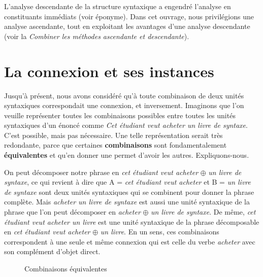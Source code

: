 L’analyse descendante de la structure syntaxique a engendré l’analyse en constituants immédiats (voir  éponyme). Dans cet ouvrage, nous privilégions une analyse ascendante, tout en exploitant les avantages d’une analyse descendante (voir la  \textit{Combiner les méthodes ascendante et descendante}).

\section{La connexion et ses instances}\label{sec:3.2.14}

Jusqu’à présent, nous avons considéré qu’à toute combinaison de deux unités syntaxiques correspondait une connexion, et inversement. Imaginons que l’on veuille représenter toutes les combinaisons possibles entre toutes les unités syntaxiques d’un énoncé comme \textit{Cet étudiant veut acheter un livre de syntaxe}. C’est possible, mais pas nécessaire. Une telle représentation serait très redondante, parce que certaines \textbf{combinaisons} sont fondamentalement \textbf{équivalentes} et qu’en donner une permet d’avoir les autres. Expliquons-nous.

On peut décomposer notre phrase en \textit{cet étudiant veut acheter} ${\oplus}$ \textit{un livre de syntaxe}, ce qui revient à dire que A = \textit{cet étudiant veut acheter} et B = \textit{un livre de syntaxe} sont deux unités syntaxiques qui se combinent pour donner la phrase complète. Mais \textit{acheter un livre de syntaxe} est aussi une unité syntaxique de la phrase que l’on peut décomposer en \textit{acheter} ${\oplus}$ \textit{un livre de syntaxe}. De même, \textit{cet étudiant veut acheter un livre} est une unité syntaxique de la phrase décomposable en \textit{cet étudiant veut acheter} ${\oplus}$ \textit{un livre}. En un sens, ces combinaisons correspondent à une seule et même connexion qui est celle du verbe \textit{acheter} avec son complément d’objet direct.

\begin{figure}
\caption{\label{fig:}Combinaisons équivalentes}
\end{figure}

